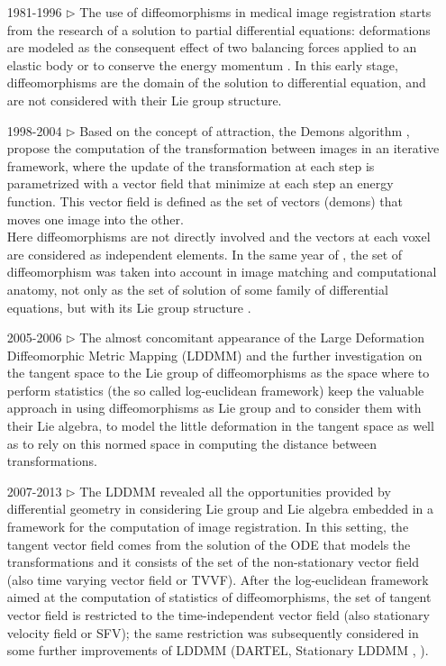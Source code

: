 \begin{enumerate}
	\item[1981-1996 $\triangleright$] The use of diffeomorphisms in medical image registration starts from the research of a solution to partial differential equations: deformations are modeled as the consequent effect of two balancing forces applied to an elastic body \cite{Broit:1981} or to conserve the energy momentum \cite{christensen1996deformable}. In this early stage, diffeomorphisms are the domain of the solution to differential equation, and are not considered with their Lie group structure.
	\item[1998-2004 $\triangleright$] Based on the concept of attraction, the Demons algorithm \cite{thirion1998image}, \cite{pennec1999understanding} propose the computation of the transformation between images in an iterative framework, where the update of the transformation at each step is parametrized with a vector field that minimize at each step an energy function. This vector field is defined as the set of vectors (demons) that moves one image into the other. \\
	Here diffeomorphisms are not directly involved and the vectors at each voxel are considered as independent elements. 
	In the same year of \cite{thirion1998image}, the set of diffeomorphism was taken into account in image matching and computational anatomy, not only as the set of solution of some family of differential equations, but with its Lie group structure \cite{Dupuis:98:variationalproblems,  trouve1998diffeomorphisms, grenander1998computational}.
	\item[2005-2006 $\triangleright$] The almost concomitant appearance of the Large Deformation Diffeomorphic Metric Mapping (LDDMM) \cite{beg2005computing} and the further investigation on the tangent space to the Lie group of diffeomorphisms as the space where to perform statistics (the so called log-euclidean framework) \cite{arsigny2006statistics, Arsigny:MRM:06} keep the valuable approach in using diffeomorphisms as Lie group and to consider them with their Lie algebra, to model the little deformation in the tangent space as well as to rely on this normed space in computing the distance between transformations.
	\item[2007-2013 $\triangleright$] The LDDMM revealed all the opportunities provided by differential geometry in considering Lie group and Lie algebra embedded in a framework for the computation of image registration. In this setting, the tangent vector field comes from the solution of the ODE that models the transformations and it consists of the set of the non-stationary vector field (also time varying vector field or TVVF). After the log-euclidean framework \cite{arsigny2006statistics} aimed at the computation of statistics of diffeomorphisms, the set of tangent vector field is restricted to the time-independent vector field (also stationary velocity field or SFV); the same restriction was subsequently considered in some further improvements of LDDMM (DARTEL, Stationary LDDMM \cite{Ashburner:07}, \cite{hernandez2007registration}). 

\end{enumerate}
